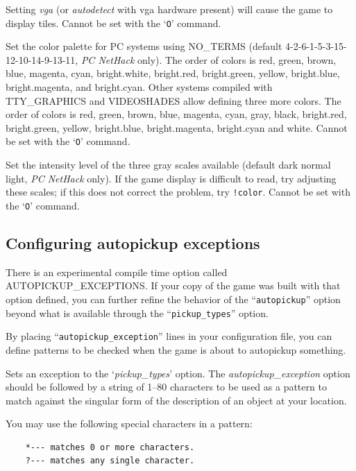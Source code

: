 Setting {\it vga\/} (or {\it autodetect\/} with vga hardware present) will cause
the game to display tiles. 
Cannot be set with the `{\tt O}' command.
\item[\ib{videocolors}]
\begin{sloppypar}
Set the color palette for PC systems using NO\_TERMS
(default 4-2-6-1-5-3-15-12-10-14-9-13-11, {\it PC\/ NetHack\/} only).
The order of colors is red, green, brown, blue, magenta, cyan,
bright.white, bright.red, bright.green, yellow, bright.blue,
bright.magenta, and bright.cyan.
Other systems compiled with TTY\_GRAPHICS and VIDEOSHADES allow defining 
three more colors. The order of colors is red, green, brown, blue, 
magenta, cyan, gray, black, bright.red, bright.green, yellow, 
bright.blue, bright.magenta, bright.cyan and white.
Cannot be set with the `{\tt O}' command.
\end{sloppypar}
\item[\ib{videoshades}]
Set the intensity level of the three gray scales available
(default dark normal light, {\it PC\/ NetHack\/} only).
If the game display is difficult to read, try adjusting these scales;
if this does not correct the problem, try {\tt !color}.
Cannot be set with the `{\tt O}' command.
\elist

\subsection*{Configuring autopickup exceptions}

There is an experimental compile time option called AUTOPICKUP_EXCEPTIONS.  
If your copy of the game was built with that option defined, you can 
further refine the behavior of the ``{\tt autopickup}'' option beyond 
what is available through the ``{\tt pickup\_types}'' option.

By placing ``{\tt autopickup\_exception}'' lines in your configuration
file, you can define patterns to be checked when the game is about to
autopickup something.

\blist{}
\item[\ib{autopickup\_exception}]
Sets an exception to the `{\it pickup\_types}' option.
The {\it autopickup\_exception\/} option should be followed by a string of 1--80
characters to be used as a pattern to match against the singular form
of the description of an object at your location.

You may use the following special characters in a pattern:

\begin{verbatim}
    *--- matches 0 or more characters.
    ?--- matches any single character.
\end{verbatim}

